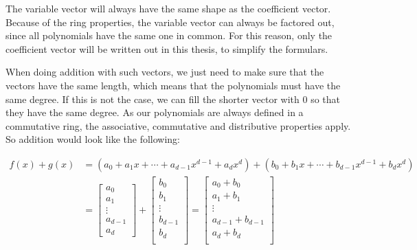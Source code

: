 The variable vector will always have the same shape as the coefficient vector. Because of the ring properties, the variable vector can always be factored out, since all polynomials have the same one in common. For this reason, only the coefficient vector will be written out in this thesis, to simplify the formulars.

When doing addition with such vectors, we just need to make sure that the vectors have the same length, which means that the polynomials must have the same degree. If this is not the case, we can fill the shorter vector with 0 so that they have the same degree. As our polynomials are always defined in a commutative  ring, the associative, commutative and distributive properties apply. So addition would look like the following:

\begin{align*}
  f(x) + g(x) & = {
  (a_0+ a_1x+\cdots+ a_{d-1}x^{d-1}+a_dx^d)+
  (b_0+ b_1x+\cdots+ b_{d-1}x^{d-1}+b_dx^d)
  }                  \\
              & = {
  \begin{bmatrix}
    a_0     \\
    a_1     \\
    \vdots  \\
    a_{d-1} \\
    a_d
  \end{bmatrix} + 
  \begin{bmatrix}
    b_0     \\
    b_1     \\
    \vdots  \\
    b_{d-1} \\
    b_d     \\
  \end{bmatrix} }     = {
  \begin{bmatrix}
    a_0     +     b_0   \\
    a_1     +  b_1      \\
    \vdots              \\
    a_{d-1} +   b_{d-1} \\
    a_d +   b_d         \\
  \end{bmatrix}
  }                  \\
\end{align*}

